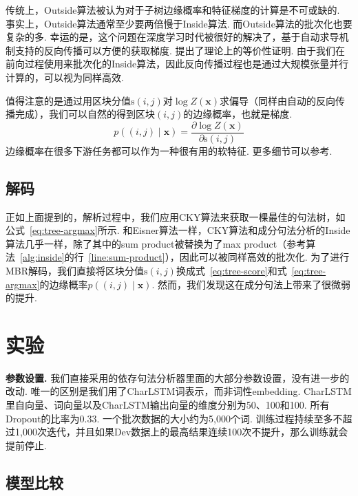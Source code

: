 传统上，Outside算法被认为对于子树边缘概率和特征梯度的计算是不可或缺的.
事实上，Outside算法通常至少要两倍慢于Inside算法.
而Outside算法的批次化也要复杂的多.
幸运的是，这个问题在深度学习时代被很好的解决了，基于自动求导机制支持的反向传播可以方便的获取梯度.
\citet{eisner-2016-inside}提出了理论上的等价性证明.
由于我们在前向过程使用来批次化的Inside算法，因此反向传播过程也是通过大规模张量并行计算的，可以视为同样高效.

值得注意的是通过用区块分值$\mathrm{s}(i,j)$对$\log Z(\boldsymbol{x})$求偏导（同样由自动的反向传播完成），我们可以自然的得到区块$(i,j)$的边缘概率，也就是梯度.
\begin{equation} \label{eq:con-partial-derivative}
  p((i, j)\mid\boldsymbol{x}) = \frac{\partial \log Z(\boldsymbol{x})}{\partial \mathrm{s}(i, j)}
\end{equation}
边缘概率在很多下游任务都可以作为一种很有用的软特征.
更多细节可以参考\citet{eisner-2016-inside}.

\subsection{解码}

正如上面提到的，解析过程中，我们应用CKY算法来获取一棵最佳的句法树，如公式~\ref{eq:tree-argmax}所示.
和Eisner算法一样，CKY算法和成分句法分析的Inside算法几乎一样，除了其中的sum product被替换为了max product（参考算法~\ref{alg:inside}的行~\ref{line:sum-product}），因此可以被同样高效的批次化.
为了进行MBR解码，我们直接将区块分值$\mathrm{s}(i,j)$换成式~\ref{eq:tree-score}和式~\ref{eq:tree-argmax}的边缘概率$p((i,j)\mid\boldsymbol{x})$.
然而，我们发现这在成分句法上带来了很微弱的提升.

\section{实验}
\label{sec:con-experiments}

\noindent\textbf{参数设置.}
我们直接采用\citet{dozat-etal-2017-biaffine}的依存句法分析器里面的大部分参数设置，没有进一步的改动.
唯一的区别是我们用了CharLSTM词表示，而非词性embedding.
CharLSTM里自向量、词向量以及CharLSTM输出向量的维度分别为50、100和100.
所有Dropout的比率为0.33.
一个批次数据的大小约为5,000个词.
训练过程持续至多不超过1,000次迭代，并且如果Dev数据上的最高结果连续100次不提升，那么训练就会提前停止.



\subsection{模型比较}

